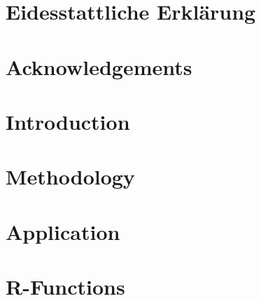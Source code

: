 \documentclass[a4paper,twoside,12pt,appendixprefix=true,bibliography=totoc,listof=totoc]{scrbook}
\begin{document}
\pagestyle{empty} %

\pagestyle{plain} %

\onehalfspacing    %


\chapter*{Eidesstattliche Erklärung}

\chapter*{Acknowledgements}

\tableofcontents %
\cleardoublepage %

\chapter{Introduction}
\label{sec:Introduction}


\chapter{Methodology}
\label{sec:Methodology}





\chapter{Application}
\label{sec:Application}







%

\printbibliography
\listoffigures
\listoftables


\appendix
    \chapter{R-Functions}
		\label{sec:R-Functions}
		
\end{document}
